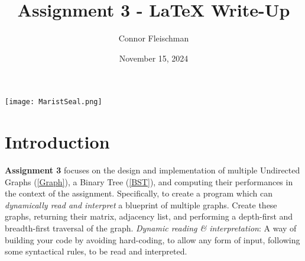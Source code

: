 \documentclass[12pt, letterpaper]{article}
\title{Assignment 3 - LaTeX Write-Up}
\author{Connor Fleischman}
\date{November 15, 2024}
\begin{document}
\maketitle
\begin{center}
   \texttt{[image: MaristSeal.png]}
\end{center}
\newpage

\tableofcontents
\newpage
\setcounter{page}{1} %

\section{Introduction}
\textbf{Assignment 3} focuses on the design and implementation of multiple Undirected Graphs (\ref{Graph}), a Binary Tree (\ref{BST}), and computing their performances in the context of the assignment.
Specifically, to create a program which can \textit{dynamically read and interpret} a blueprint of multiple graphs.
Create these graphs, returning their matrix, adjacency list, and performing a depth-first and breadth-first traversal of the graph.
\vspace*{5px}
\newline
\textit{Dynamic reading \& interpretation}: A way of building your code by avoiding hard-coding, to allow any form of input, following some syntactical rules, to be read and interpreted. 
\end{document}
